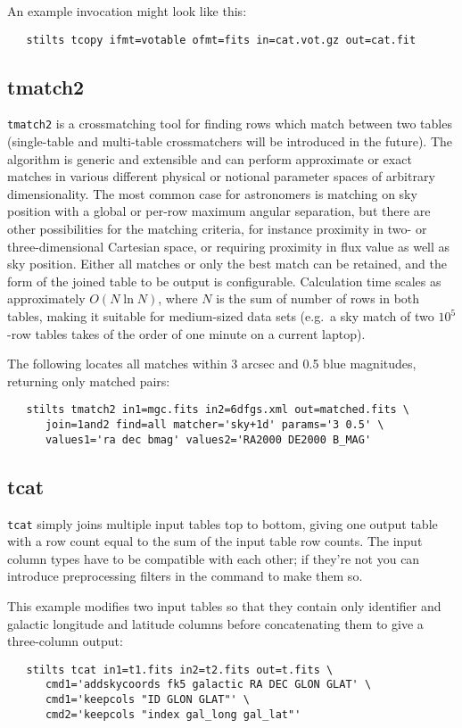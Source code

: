 \documentclass[11pt,twoside]{article}  %
\begin{document}
An example invocation might look like this:
\begin{verbatim}
   stilts tcopy ifmt=votable ofmt=fits in=cat.vot.gz out=cat.fit 
\end{verbatim}


\subsection{tmatch2}

{\tt tmatch2} is a crossmatching tool for finding rows which match
between two tables
(single-table and multi-table crossmatchers will be introduced 
in the future).
The algorithm is generic and extensible 
and can perform approximate or exact
matches in various different physical or notional parameter spaces
of arbitrary dimensionality.  The most common case for astronomers 
is matching on sky position with a global or per-row maximum angular
separation,
but there are other possibilities for the matching criteria,
for instance proximity in two- or three-dimensional Cartesian space,
or requiring proximity in flux value as well as sky position.
Either all matches or only the best match can be retained, and the
form of the joined table to be output is configurable.
Calculation time scales as approximately $O(N \ln N)$, where $N$ is
the sum of number of rows in both tables, making it
suitable for medium-sized data sets
(e.g.\ a sky match of two $10^5$-row tables takes of the order of one
minute on a current laptop).

The following locates all matches within 3 arcsec and 0.5 blue
magnitudes, returning only matched pairs:
\begin{verbatim}
   stilts tmatch2 in1=mgc.fits in2=6dfgs.xml out=matched.fits \
      join=1and2 find=all matcher='sky+1d' params='3 0.5' \
      values1='ra dec bmag' values2='RA2000 DE2000 B_MAG' 
\end{verbatim}

\subsection{tcat}

{\tt tcat} simply joins multiple input tables top to bottom, giving
one output table with a row count equal to the sum of the input table
row counts.
The input column types have to be compatible with each other;
if they're not you can introduce preprocessing 
filters in the command to make them so.

This example modifies two input tables so that they contain only 
identifier and galactic longitude and latitude columns 
before concatenating them to give a three-column output:
\begin{verbatim}
   stilts tcat in1=t1.fits in2=t2.fits out=t.fits \
      cmd1='addskycoords fk5 galactic RA DEC GLON GLAT' \
      cmd1='keepcols "ID GLON GLAT"' \
      cmd2='keepcols "index gal_long gal_lat"'
\end{verbatim}
\end{document}

